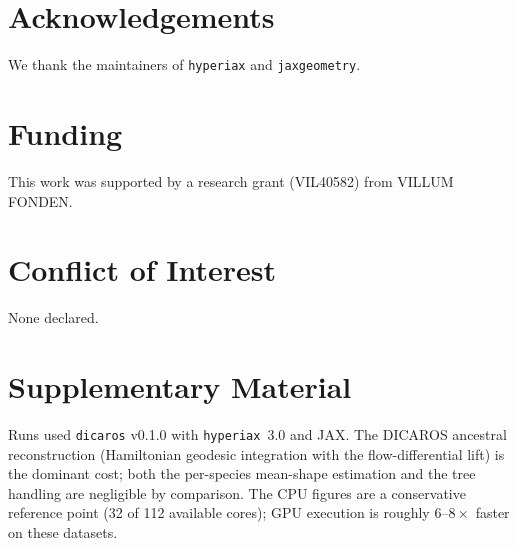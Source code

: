 \documentclass[twocolumn,10pt]{article}
\begin{document}
\section*{Acknowledgements}
We thank the maintainers of \texttt{hyperiax} and \texttt{jaxgeometry}.

\section*{Funding}
This work was supported by a research grant (VIL40582) from VILLUM FONDEN.

\section*{Conflict of Interest}
None declared.

{\footnotesize

}

\clearpage
\onecolumn
\setcounter{table}{0}
\renewcommand{\thetable}{S\arabic{table}}
\section*{Supplementary Material}

\begin{table}[h]
\centering
\caption{\textbf{Reconstruction wall-clock time for \texttt{dicaros} on the two
example datasets, on CPU and GPU.} CPU runs were executed on an Intel Xeon Gold
5420+, pinned to 32 logical cores; the GPU runs used a single NVIDIA RTX 6000
Ada Generation (49\,GB). Times are wall-clock and include JAX just-in-time
compilation. CPU and GPU reconstructions produce the same tree topology and
internal-node labels, and agree on node coordinates to floating-point
reduction tolerance (guenon: maximum coordinate difference $2.9\times10^{-4}$;
leaves: maximum $1.3\times10^{-2}$, mean $2.0\times10^{-5}$).}
\label{tab:runtime}
\end{table}

\noindent
Runs used \texttt{dicaros} v0.1.0 with \texttt{hyperiax}~3.0 and JAX. The DICAROS
ancestral reconstruction (Hamiltonian geodesic integration with the
flow-differential lift) is the dominant cost; both the per-species mean-shape
estimation and the tree handling are negligible by comparison. The CPU figures
are a conservative reference point (32 of 112 available cores); GPU execution is
roughly $6$--$8\times$ faster on these datasets.
\end{document}
